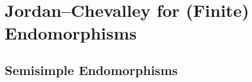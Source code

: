 \section{Jordan--Chevalley for (Finite) Endomorphisms}





\subsection{Semisimple Endomorphisms}




